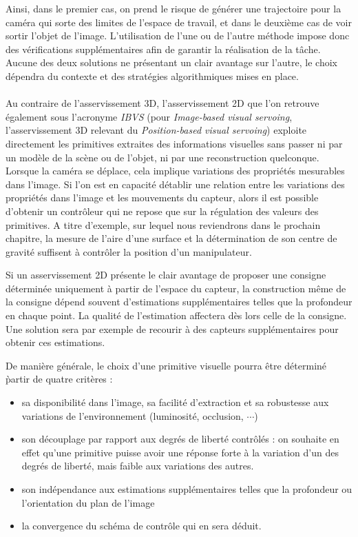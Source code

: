 Ainsi, dans le premier cas, on prend le risque de g\'en\'erer une trajectoire 
pour la cam\'era qui sorte des limites de l'espace de travail, et dans le 
deuxi\`eme cas de voir sortir l'objet de l'image. L'utilisation de l'une ou de 
l'autre m\'ethode impose donc des v\'erifications suppl\'ementaires afin de 
garantir la r\'ealisation de la t\^ache. Aucune des deux solutions ne 
pr\'esentant un clair avantage sur l'autre, le choix d\'ependra du contexte et 
des strat\'egies algorithmiques mises en place.\\

 \\

Au contraire de l'asservissement 3D, l'asservissement 2D que l'on retrouve 
\'egalement sous l'acronyme {\it IBVS} (pour {\it Image-based visual servoing}, 
l'asser\-vissement 3D relevant du {\it Position-based visual servoing}) 
exploite directement les primitives extraites des informations visuelles sans 
passer ni par un mod\`ele de la sc\`ene ou de l'objet, ni par une 
reconstruction quelconque. Lorsque la cam\'era se d\'eplace, cela implique 
variations des propri\'et\'es mesurables dans l'image. Si l'on est en capacit\'e 
d\'etablir une relation entre les variations des propri\'et\'es dans l'image et 
les mouvements du capteur, alors il est possible d'obtenir un contr\^oleur qui 
ne repose que sur la r\'egulation des valeurs des primitives. A titre d'exemple, 
sur lequel nous reviendrons dans le prochain chapitre, la mesure de l'aire d'une 
surface et la d\'etermination de son centre de gravit\'e suffisent \`a 
contr\^oler la position d'un manipulateur.

Si un asservissement 2D pr\'esente le clair avantage de proposer une consigne 
d\'etermin\'ee uniquement \`a partir de l'espace du capteur, la construction 
m\^eme de la consigne d\'epend souvent d'estimations suppl\'ementaires telles 
que la profondeur en chaque point. La qualit\'e de l'estimation affectera d\`es 
lors celle de la consigne. Une solution sera par exemple de recourir \`a 
des capteurs suppl\'ementaires pour obtenir ces estimations. 

De mani\`ere g\'en\'erale, le choix d'une primitive visuelle pourra \^etre 
d\'etermin\'e \` partir de quatre crit\`eres :
\begin{itemize}
 \item sa disponibilit\'e dans l'image, sa facilit\'e d'extraction et sa 
robustesse aux variations de l'environnement (luminosit\'e, occlusion, $\cdots$)
  \item son d\'ecouplage par rapport aux degr\'es de libert\'e contr\^ol\'es : 
on souhaite en effet qu'une primitive puisse avoir une r\'eponse forte \`a la 
variation d'un des degr\'es de libert\'e, mais faible aux variations des autres.
  \item son ind\'ependance aux estimations suppl\'ementaires telles que la 
profondeur ou l'orientation du plan de l'image
  \item la convergence du sch\'ema de contr\^ole qui en sera d\'eduit.
\end{itemize}

